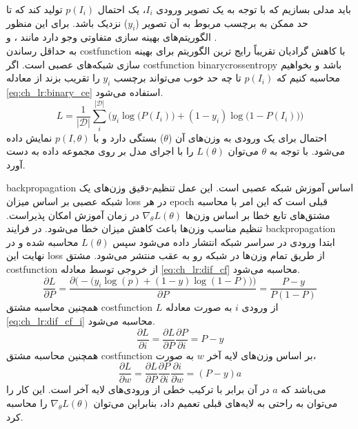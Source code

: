 باید مدلی بسازیم که با توجه به یک تصویر ورودی $I_i$، یک احتمال $p(I_i)$ تولید کند که تا حد ممکن به برچسب مربوط به آن تصویر ($y_i$) نزدیک باشد. برای این منظور الگوریتم‌های بهینه سازی متفاوتی وجو دارد مانند ،  و 
.\\
 به حداقل رساندن \gls{costfunction} با کاهش گرادیان تقریباً رایج ترین الگوریتم برای بهینه سازی شبکه‌‌های عصبی است. اگر \gls{costfunction} \gls{binarycrossentropy} باشد و بخواهیم محاسبه کنیم که $p(I_i)$ تا چه حد خوب می‌تواند برچسب $y_i$ را تقریب بزند از معادله \ref{eq:ch_lr:binary_ce} استفاده می‌شود.
 \begin{equation}
 	L = \frac{1}{|\mathcal{D}|}  \sum_i^{|\mathcal{D}|}\Big(y_i \log\big(P(I_i)\big) + (1-y_i) \log\big(1-P(I_i)\big)\Big)
 	\label{eq:ch_lr:binary_ce}
 \end{equation}
 احتمال برای یک ورودی به وزن‌های آن ($\theta$) بستگی دارد و با
 $p(I, \theta)$ 
 نمایش داده می‌شود. با توجه به $\theta$ می‌توان $L(\theta)$ را با اجرای مدل بر روی مجموعه داده به دست آورد.
 
 \gls{backpropagation}
 اساس آموزش شبکه عصبی است. این عمل تنظیم-دقیق  وزن‌های یک شبکه عصبی بر اساس میزان \gls{loss} در هر \gls{epoch} قبلی است که این امر با محاسبه مشتق‌های تابع خطا بر اساس وزن‌ها 
 $\nabla_\theta L(\theta)$
 در زمان آموزش امکان پذیراست. تنظیم مناسب وزن‌ها  باعث کاهش میزان خطا می‌شود. در فرایند \gls{backpropagation}  ابتدا ورودی در سراسر شبکه انتشار داده می‌شود سپس $L(\theta)$ محاسبه شده و در نهایت این \gls{loss} از طریق تمام وزن‌ها در شبکه رو به عقب منتشر می‌شود. مشتق \gls{costfunction} از خروجی توسط معادله \ref{eq:ch_lr:dif_cf} محاسبه می‌شود.
 \begin{equation}
 	\frac{\partial L}{\partial P} = \frac{\partial \Big(-\big(y_i \log(p) + (1-y)\log(1-P)\big)\Big)}{\partial P} = \frac{P-y}{P(1-P)}
 	\label{eq:ch_lr:dif_cf}
 \end{equation}
 همچنین محاسبه مشتق \gls{costfunction} $L$ از ورودی $i$ به صورت معادله \ref{eq:ch_lr:dif_cf_i} محاسبه می‌شود.
  \begin{equation}
 	\frac{\partial L}{\partial i} = \frac{\partial L}{\partial P} \frac{\partial P}{\partial i} = P-y
 	\label{eq:ch_lr:dif_cf_i}
 \end{equation}
 همچنین محاسبه مشتق \gls{costfunction} بر اساس وزن‌های لایه آخر $w$ به صورت، 
   \begin{equation}
 	\frac{\partial L}{\partial w} = \frac{\partial L}{\partial P} \frac{\partial P}{\partial i}  \frac{\partial i}{\partial w}= (P-y)a
 	\label{eq:ch_lr:dif_cf_w}
 \end{equation}
 می‌باشد که $a$ در آن برابر با ترکیب خطی از ورودی‌های لایه آخر است. این کار را می‌توان به راحتی به لایه‌های قبلی تعمیم داد، بنابراین می‌توان $\nabla _\theta L(\theta)$ را محاسبه کرد.
